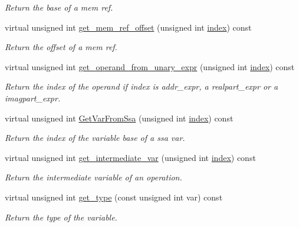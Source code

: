 \begin{DoxyCompactItemize}
\begin{DoxyCompactList}\small\item\em Return the base of a mem ref. \end{DoxyCompactList}\item 
virtual unsigned int \hyperlink{classBehavioralHelper_a58132ba58a157b34ad4e69a1ca1a5802}{get\+\_\+mem\+\_\+ref\+\_\+offset} (unsigned int \hyperlink{tutorial__pact__2019_2Introduction_2third_2include_2Keccak_8h_a028c9bdc8344cca38ab522a337074797}{index}) const
\begin{DoxyCompactList}\small\item\em Return the offset of a mem ref. \end{DoxyCompactList}\item 
virtual unsigned int \hyperlink{classBehavioralHelper_abc594fddf1e643e040bef82bb2814561}{get\+\_\+operand\+\_\+from\+\_\+unary\+\_\+expr} (unsigned int \hyperlink{tutorial__pact__2019_2Introduction_2third_2include_2Keccak_8h_a028c9bdc8344cca38ab522a337074797}{index}) const
\begin{DoxyCompactList}\small\item\em Return the index of the operand if index is addr\+\_\+expr, a realpart\+\_\+expr or a imagpart\+\_\+expr. \end{DoxyCompactList}\item 
virtual unsigned int \hyperlink{classBehavioralHelper_aee0f46734f9ca668346fbf515f1aa009}{Get\+Var\+From\+Ssa} (unsigned int \hyperlink{tutorial__pact__2019_2Introduction_2third_2include_2Keccak_8h_a028c9bdc8344cca38ab522a337074797}{index}) const
\begin{DoxyCompactList}\small\item\em Return the index of the variable base of a ssa var. \end{DoxyCompactList}\item 
virtual unsigned int \hyperlink{classBehavioralHelper_a391009a10b8b6ff6ca10168f19a2a56d}{get\+\_\+intermediate\+\_\+var} (unsigned int \hyperlink{tutorial__pact__2019_2Introduction_2third_2include_2Keccak_8h_a028c9bdc8344cca38ab522a337074797}{index}) const
\begin{DoxyCompactList}\small\item\em Return the intermediate variable of an operation. \end{DoxyCompactList}\item 
virtual unsigned int \hyperlink{classBehavioralHelper_a00e1217fcbbe785c40ed9aa289fbe4df}{get\+\_\+type} (const unsigned int var) const
\begin{DoxyCompactList}\small\item\em Return the type of the variable. \end{DoxyCompactList}\item 

\end{DoxyCompactItemize}
